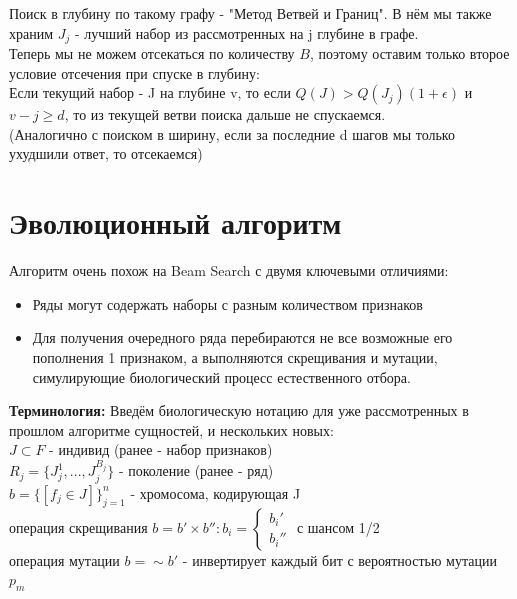 Поиск в глубину по такому графу - "Метод Ветвей и Границ". В нём мы также храним $J_j$ - лучший набор из рассмотренных на j глубине в графе.\\ 
Теперь мы не можем отсекаться по количеству $B$, поэтому оставим только второе условие отсечения при спуске в глубину:\\
Если текущий набор - J на глубине v, то если $Q(J)>Q(J_j) (1+\epsilon)$ и $v-j \geq d$, то из текущей ветви поиска дальше не спускаемся.\\
(Аналогично с поиском в ширину, если за последние d шагов мы только ухудшили ответ, то отсекаемся)

\section{Эволюционный алгоритм}

Алгоритм очень похож на Beam Search с двумя ключевыми отличиями:
\begin{itemize}
\item Ряды могут содержать наборы с разным количеством признаков  
\item Для получения очередного ряда перебираются не все возможные его пополнения 1 признаком, а выполняются скрещивания и мутации, симулирующие биологический процесс естественного отбора.
\end{itemize}

\textbf{Терминология:} Введём биологическую нотацию для уже рассмотренных в прошлом алгоритме сущностей, и нескольких новых: \\
$J \subset F$ - индивид (ранее - набор признаков)\\ $R_j = \{ J_j^{1}, ..., J_j^{B_j}\}$ - поколение (ранее - ряд)\\ $b = \{[f_j \in J]\}_{j=1}^n$ - хромосома, кодирующая J\\
операция скрещивания $b=b' \times b'': b_i=\begin{cases} b_i' \\ b_i'' \end{cases}$ с шансом 1/2\\
операция мутации $b=\sim b'$ - инвертирует каждый бит с вероятностью мутации $p_m$

